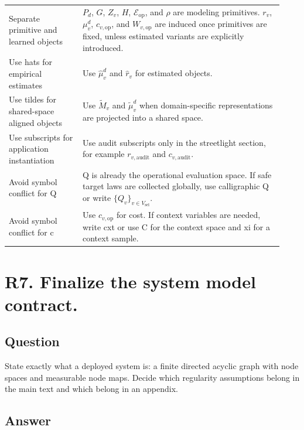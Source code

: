 \documentclass[11pt,a4paper]{article}
\begin{document}
\begin{landscape}
\begin{longtable}{@{}P{0.25\linewidth} P{0.68\linewidth}@{}}
Separate primitive and learned objects & \(P_d\), \(G\), \(Z_v\), \(H\), \(\mathcal{E}_{\mathrm{op}}\), and \(\rho\) are modeling primitives. \(r_v\), \(\mu_v^d\), \(c_{v,\mathrm{op}}\), and \(W_{v,\mathrm{op}}\) are induced once primitives are fixed, unless estimated variants are explicitly introduced.\\
Use hats for empirical estimates & Use \(\widehat{\mu}_v^d\) and \(\widehat{r}_v\) for estimated objects.\\
Use tildes for shared-space aligned objects & Use \(\widetilde{M}_v\) and \(\widetilde{\mu}_v^d\) when domain-specific representations are projected into a shared space.\\
Use subscripts for application instantiation & Use audit subscripts only in the streetlight section, for example \(r_{v,\mathrm{audit}}\) and \(c_{v,\mathrm{audit}}\).\\
Avoid symbol conflict for Q & Q is already the operational evaluation space. If safe target laws are collected globally, use calligraphic Q or write \(\{Q_v\}_{v\in V_{\mathrm{sel}}}\).\\
Avoid symbol conflict for c & Use \(c_{v,\mathrm{op}}\) for cost. If context variables are needed, write cxt or use C for the context space and xi for a context sample.\\
\end{longtable}

\end{landscape}
\normalsize
\section*{R7. Finalize the system model contract.}

\subsection*{Question}

State exactly what a deployed system is: a finite directed acyclic graph with node spaces and measurable node maps. Decide which regularity assumptions belong in the main text and which belong in an appendix.

\subsection*{Answer}
\end{document}
